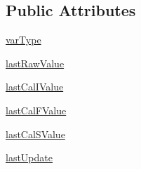 \subsection*{Public Attributes}
\begin{DoxyCompactItemize}
\item 
\hyperlink{class_ground_segment_1_1models_1_1_tlmy_var_type_1_1_tlmy_var_type_a3b48452b095327f2cefab2aec6b48c9b}{var\+Type}
\item 
\hyperlink{class_ground_segment_1_1models_1_1_tlmy_var_type_1_1_tlmy_var_type_ad87b579e5f188466f53b239199e52861}{last\+Raw\+Value}
\item 
\hyperlink{class_ground_segment_1_1models_1_1_tlmy_var_type_1_1_tlmy_var_type_a26e2e133172878436da42acf364a07d7}{last\+Cal\+I\+Value}
\item 
\hyperlink{class_ground_segment_1_1models_1_1_tlmy_var_type_1_1_tlmy_var_type_addfc93bd7287219c19e1c68dcd72be80}{last\+Cal\+F\+Value}
\item 
\hyperlink{class_ground_segment_1_1models_1_1_tlmy_var_type_1_1_tlmy_var_type_ad9cbf2bf14489a1a6c2908eb67076ca4}{last\+Cal\+S\+Value}
\item 
\hyperlink{class_ground_segment_1_1models_1_1_tlmy_var_type_1_1_tlmy_var_type_acd348562666a80fe077f5e1809bde3d5}{last\+Update}
\end{DoxyCompactItemize}

